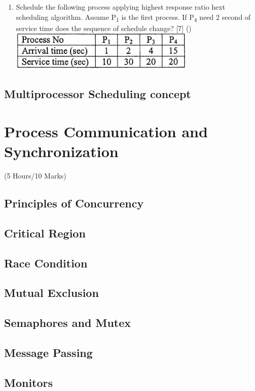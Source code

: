 \documentclass[12pt]{article}
\newcommand{\sub}[1]{\textsubscript{#1}}
\begin{document}
\begin{enumerate}
		\item Schedule the following process applying highest response ratio hext scheduling algorithm. Assume P\sub{1} is the first process. If P\sub{4} need 2 second of service time does the sequence of schedule change? \hfill [7] ()\\
		\includegraphics[width=3.5in]{os_24}
	\end{enumerate}
	
	\subsection{Multiprocessor Scheduling concept}

	\pagebreak
\section{Process Communication and Synchronization}
\begin{center}(5 Hours/10 Marks)\end{center}
\subsection{Principles of Concurrency}
\subsection{Critical Region}
\subsection{Race Condition}
\subsection{Mutual Exclusion}
\subsection{Semaphores and Mutex}
\subsection{Message Passing}
\subsection{Monitors}
\end{document}
